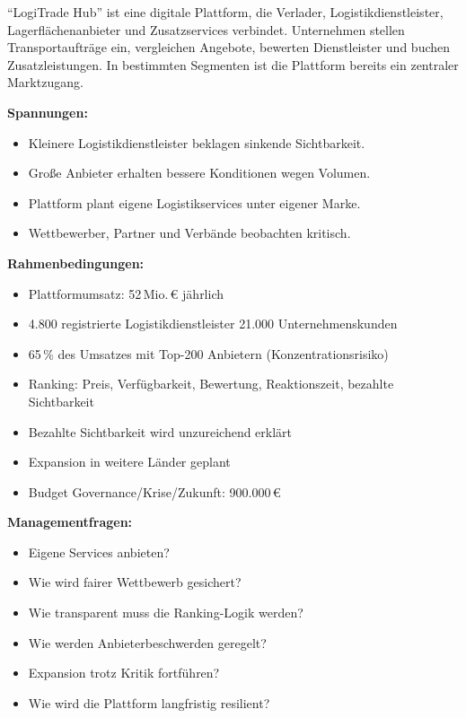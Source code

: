 \documentclass[11pt,a4paper,oneside]{article}
\begin{document}
\begin{infobox}
``LogiTrade Hub'' ist eine digitale Plattform, die Verlader, Logistikdienstleister, Lagerflächenanbieter und Zusatzservices verbindet. Unternehmen stellen Transportaufträge ein, vergleichen Angebote, bewerten Dienstleister und buchen Zusatzleistungen. In bestimmten Segmenten ist die Plattform bereits ein zentraler Marktzugang.

\smallskip
\textbf{Spannungen:}
\begin{itemize}
  \item Kleinere Logistikdienstleister beklagen sinkende Sichtbarkeit.
  \item Große Anbieter erhalten bessere Konditionen wegen Volumen.
  \item Plattform plant eigene Logistikservices unter eigener Marke.
  \item Wettbewerber, Partner und Verbände beobachten kritisch.
\end{itemize}

\smallskip
\textbf{Rahmenbedingungen:}
\begin{itemize}
  \item Plattformumsatz: 52\,Mio.\,\euro{} jährlich
  \item 4.800 registrierte Logistikdienstleister \textperiodcentered{} 21.000 Unternehmenskunden
  \item 65\,\% des Umsatzes mit Top-200 Anbietern (Konzentrationsrisiko)
  \item Ranking: Preis, Verfügbarkeit, Bewertung, Reaktionszeit, bezahlte Sichtbarkeit
  \item Bezahlte Sichtbarkeit wird unzureichend erklärt
  \item Expansion in weitere Länder geplant
  \item Budget Governance/Krise/Zukunft: 900.000\,\euro
\end{itemize}

\smallskip
\textbf{Managementfragen:}
\begin{itemize}
  \item Eigene Services anbieten?
  \item Wie wird fairer Wettbewerb gesichert?
  \item Wie transparent muss die Ranking-Logik werden?
  \item Wie werden Anbieterbeschwerden geregelt?
  \item Expansion trotz Kritik fortführen?
  \item Wie wird die Plattform langfristig resilient?
\end{itemize}
\end{infobox}
\end{document}
